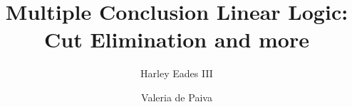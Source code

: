 \usepackage{amssymb,amsmath}
\usepackage{cmll}
\usepackage{stmaryrd}
\usepackage{todonotes}
\usepackage{mathpartir}
\usepackage{hyperref}
\usepackage[barr]{xy}


\title{Multiple Conclusion Linear Logic: \\ Cut Elimination and more}
\author{Harley Eades III \and Valeria de Paiva}
\date{}

\usepackage{color}



\renewcommand{\FILLdrulename}[1]{\scriptsize \textsc{#1}}
\newcommand{\ifrName}[1]{\scriptsize \textsc{#1}}

\newcommand{\cat}[1]{\mathcal{#1}}
\newcommand{\catop}[1]{\cat{#1}^{\mathsf{op}}}
\newcommand{\homs}[3]{\mathsf{Hom}_{\cat{#1}}(#2,#3)}
\newcommand{\limp}[0]{\multimap}
\newcommand{\dial}[0]{\mathsf{Dial_2}(\mathsf{Sets})}
\newcommand{\sets}[0]{\mathsf{Sets}}
\newcommand{\obj}[1]{\mathsf{Obj}(#1)}
\newcommand{\mor}[1]{\mathsf{Mor(#1)}}
\newcommand{\id}[0]{\mathsf{id}}
\newcommand{\lett}[0]{\mathsf{let}\,}
\newcommand{\inn}[0]{\,\mathsf{in}\,}
\newcommand{\cur}[1]{\mathsf{cur}(#1)}
\newcommand{\curi}[1]{\mathsf{cur}^{-1}(#1)}




\newcommand{\rcond}[0]{\refstepcounter{condCounter}\arabic{condCounter}}


\maketitle

